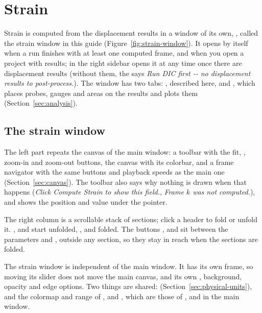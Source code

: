 \section{Strain}
\label{sec:strain}

Strain is computed from the displacement results in a window of its own, , called the strain window in this guide (Figure~\ref{fig:strain-window}). It
opens by itself when a run finishes with at least one computed frame, and when you open a project
with results;  in the right sidebar opens it at
any time once there are displacement results (without them, the  says \emph{Run DIC
first -{}- no displacement results to post-process.}). The window has two tabs: , described here, and , which places probes, gauges and areas on the results
and plots them (Section~\ref{sec:analysis}).


\subsection{The strain window}

The left part repeats the canvas of the main window: a toolbar with the fit, , zoom-in
and zoom-out buttons, the canvas with its colorbar, and a frame navigator with the same buttons and
playback speeds as the main one (Section~\ref{sec:canvas}). The toolbar also says why nothing is
drawn when that happens (\emph{Click Compute Strain to show this field.}, \emph{Frame $k$ was not
computed.}), and shows the position and value under the pointer.

The right column is a scrollable stack of sections; click a header to fold or unfold it.
,  and  start unfolded, ,
 and  folded. The buttons ,  and
 sit between the parameters and , outside any section, so they stay
in reach when the sections are folded.

The strain window is independent of the main window. It has its own frame, so moving its slider
does not move the main canvas, and its own , background, opacity and edge options.
Two things are shared:  (Section~\ref{sec:physical-units}), and the colormap
and range of ,  and , which are those of ,  and
 in the main window.

